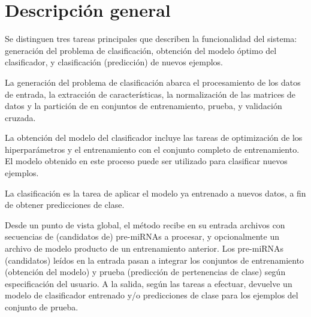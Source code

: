 %
%
%
\section{Descripción general}
%
Se distinguen tres tareas principales que describen la funcionalidad
del sistema: generación del problema de clasificación, obtención del
modelo óptimo del clasificador, y clasificación (predicción) de nuevos
ejemplos.

La generación del problema de clasificación abarca el procesamiento de
los datos de entrada, la extracción de características, la
normalización de las matrices de datos y la partición de en conjuntos
de entrenamiento, prueba, y validación cruzada.

La obtención del modelo del clasificador incluye las tareas de
optimización de los hiperparámetros y el entrenamiento con el conjunto
completo de entrenamiento.  El modelo obtenido en este proceso puede
ser utilizado para clasificar nuevos ejemplos.

La clasificación es la tarea de aplicar el modelo ya entrenado a
nuevos datos, a fin de obtener predicciones de clase.

Desde un punto de vista global, el método recibe en su entrada
archivos con secuencias de (candidatos de) pre-miRNAs a procesar, y
opcionalmente un archivo de modelo producto de un entrenamiento
anterior.  Los pre-miRNAs (candidatos) leídos en la entrada pasan a
integrar los conjuntos de entrenamiento (obtención del modelo) y
prueba (predicción de pertenencias de clase) según especificación del
usuario.  A la salida, según las tareas a efectuar, devuelve un modelo
de clasificador entrenado y/o predicciones de clase para los ejemplos
del conjunto de prueba.

